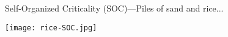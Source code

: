 \begin{frame}


Self-Organized Criticality (SOC)---Piles of sand and rice...

\texttt{[image: rice-SOC.jpg]}

\end{frame}
